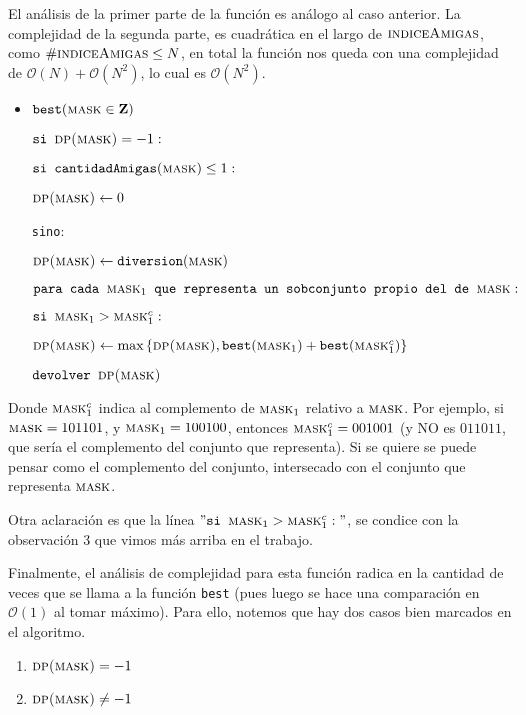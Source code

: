 	El análisis de la primer parte de la función es análogo al caso anterior. La complejidad de la segunda parte, es cuadrática en el largo de $\textsc{indiceAmigas}$, como $\# \textsc{indiceAmigas} \leq N$, en total la función nos queda con una complejidad de $\mathcal{O}(N) + \mathcal{O}(N^2)$, lo cual es $\mathcal{O}(N^2)$.
	
\begin{itemize}
	
	\item $\texttt{best}(\textsc{mask} \in \mathbf{Z})$
	
	$\texttt{si } \textsc{dp(mask)} = -1:$
	
	\quad 	$\texttt{si cantidadAmigas}(\textsc{mask}) \leq 1:$
	
	\quad \quad $ \textsc{dp(mask)} \leftarrow 0$
	
	\quad \texttt{sino}:
	
	\quad \quad $ \textsc{dp(mask)} \leftarrow \texttt{diversion}(\textsc{mask})$
	
	\quad \quad $ \texttt{para cada } \textsc{mask}_1 \texttt{ que representa un sobconjunto propio del de } \textsc{mask}:$
	
	\quad \quad \quad $\texttt{si } \textsc{mask}_1 > \textsc{mask}_1^c:$
	
	\quad \quad \quad \quad $\textsc{dp(mask)} \leftarrow \text{max} \left  \{ \textsc{dp(mask)}, \texttt{best}(\textsc{mask}_1) + \texttt{best}(\textsc{mask}_1^c)  \right \} $
	
	$\texttt{devolver } \textsc{dp(mask)}$
	
\end{itemize}	

	Donde $\textsc{mask}_1^c$ indica al complemento de $\textsc{mask}_1$ relativo a $\textsc{mask}$. Por ejemplo, si $\textsc{mask} = 101101$, y $\textsc{mask}_1 = 100100$, entonces $\textsc{mask}_1^c = 001001$ (y NO es $011011$, que sería el complemento del conjunto que representa). Si se quiere se puede pensar como el complemento del conjunto, intersecado con el conjunto que representa $\textsc{mask}$.
	
	Otra aclaración es que la línea $" \texttt{si } \textsc{mask}_1 > \textsc{mask}_1^c:"$, se condice con la observación 3 que vimos más arriba en el trabajo.
	
	Finalmente, el análisis de complejidad para esta función radica en la cantidad de veces que se llama a la función \texttt{best} (pues luego se hace una comparación en $\mathcal{O}(1)$ al tomar máximo). Para ello, notemos que hay dos casos bien marcados en el algoritmo. 
	\begin{enumerate}
		\item $\textsc{dp(mask)} = -1$
		\item $\textsc{dp(mask)} \neq -1$
	\end{enumerate}

